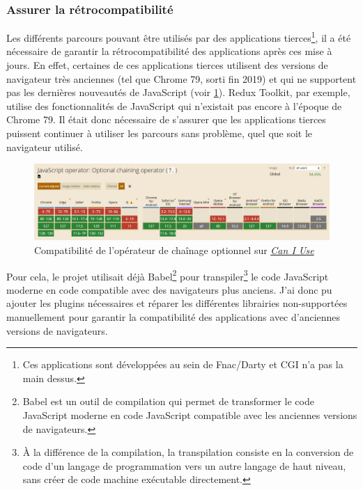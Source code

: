 \documentclass[12pt, a4paper]{report}
\begin{document}
	\newpage
	\subsubsection{Assurer la rétrocompatibilité}


	Les différents parcours pouvant être utilisés par des applications tierces\footnote{Ces applications sont développées au sein de Fnac/Darty et CGI n'a pas la main dessus.}, il a été nécessaire de garantir la rétrocompatibilité des applications après ces mise à jours. En effet, certaines de ces applications tierces utilisent des versions de navigateur très anciennes (tel que Chrome 79, sorti fin 2019) et qui ne supportent pas les dernières nouveautés de JavaScript (voir \ref{fig:can_i_use_chaining_operator}). Redux Toolkit, par exemple, utilise des fonctionnalités de JavaScript qui n'existait pas encore à l'époque de Chrome 79. Il était donc nécessaire de s'assurer que les applications tierces puissent continuer à utiliser les parcours sans problème, quel que soit le navigateur utilisé.
	
	\begin{figure}[!h]
		\centering
		\includegraphics[width=1\textwidth]{assets/images/can_i_use_chaining_operator.png}
		\vspace{-.6cm}
		\caption{Compatibilité de l'opérateur de chaînage optionnel sur \href{https://caniuse.com/mdn-javascript_operators_optional_chaining}{\textit{Can I Use}}}
		\label{fig:can_i_use_chaining_operator}
	\end{figure}
	
	Pour cela, le projet utilisait déjà Babel\footnote{Babel est un outil de compilation qui permet de transformer le code JavaScript moderne en code JavaScript compatible avec les anciennes versions de navigateurs.} pour transpiler\footnote{À la différence de la compilation, la transpilation consiste en la conversion de code d'un langage de programmation vers un autre langage de haut niveau, sans créer de code machine exécutable directement.} le code JavaScript moderne en code compatible avec des navigateurs plus anciens. J'ai donc pu ajouter les plugins nécessaires et réparer les différentes librairies non-supportées manuellement pour garantir la compatibilité des applications avec d'anciennes versions de navigateurs.
\end{document}
